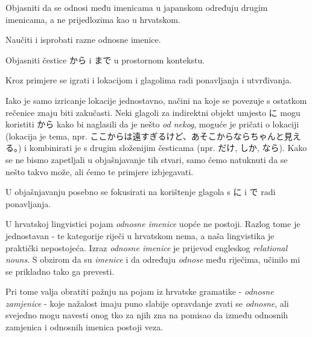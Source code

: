 
\author{Tomislav Mamić}

	
	
	\begin{hyou}
		\item Objasniti da se odnosi među imenicama u japanskom određuju drugim imenicama, a ne prijedlozima kao u hrvatskom.
		\item Naučiti i isprobati razne odnosne imenice.
		\item Objasniti čestice から i まで u prostornom kontekstu.
		\item Kroz primjere se igrati i lokacijom i glagolima radi ponavljanja i utvrđivanja.
	\end{hyou}

	
	\begin{hyou}
		\item Iako je samo izricanje lokacije jednostavno, načini na koje se povezuje s ostatkom rečenice znaju biti zakučasti. Neki glagoli za indirektni objekt umjesto に mogu koristiti から kako bi naglasili da je nešto \textit{od nekog}, moguće je pričati o lokaciji (lokacija je tema, npr. ここからは遠すぎるけど、あそこからならちゃんと見える。) i kombinirati je s drugim složenijim česticama (npr. だけ, しか, なら). Kako se ne bismo zapetljali u objašnjavanje tih stvari, samo ćemo natuknuti da se nešto takvo može, ali ćemo te primjere izbjegavati.
		\item U objašnjavanju posebno se fokusirati na korištenje glagola s に i で radi ponavljanja.
	\end{hyou}

	
	U hrvatskoj lingvistici pojam \textit{odnosne imenice} uopće ne postoji. Razlog tome je jednostavan - te kategorije riječi u hrvatskom nema, a naša lingvistika je praktički nepostojeća. Izraz \textit{odnosne imenice} je prijevod engleskog \textit{relational nouns}. S obzirom da su \textit{imenice} i da određuju \textit{odnose} među riječima, učinilo mi se prikladno tako ga prevesti.
	
	Pri tome valja obratiti pažnju na pojam iz hrvatske gramatike - \textit{odnosne zamjenice} - koje nažalost imaju puno slabije opravdanje zvati se \textit{odnosne}, ali svejedno mogu navesti onog tko za njih zna na pomisao da između odnosnih zamjenica i odnosnih imenica postoji veza.

